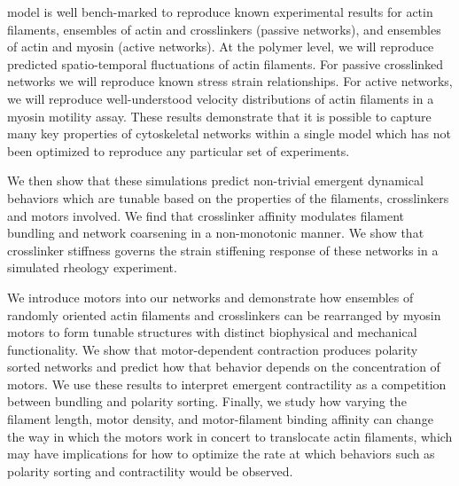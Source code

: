 \documentclass[12pt]{article} \usepackage{times} \usepackage{graphicx}
\begin{document}
model is well bench-marked to reproduce known experimental results for actin
filaments, ensembles of actin and crosslinkers (passive networks), and
ensembles of actin and myosin (active networks).  At the polymer level, we will
reproduce predicted spatio-temporal fluctuations of actin filaments.  For
passive crosslinked networks we will reproduce known stress strain
relationships. For active networks, we will reproduce well-understood velocity
distributions of actin filaments in a myosin motility assay. These results
demonstrate that it is possible to capture many key properties of cytoskeletal
networks within a single model which has not been optimized to reproduce any
particular set of experiments.  \par We then show that these simulations
predict non-trivial emergent dynamical behaviors which are tunable based on the
properties of the filaments, crosslinkers and motors involved. We find that
crosslinker affinity modulates filament bundling and network coarsening in a
non-monotonic manner. We show that crosslinker stiffness governs the strain
stiffening response of these networks in a simulated rheology experiment.  \par
We introduce motors into our networks and demonstrate how ensembles of randomly
oriented actin filaments and crosslinkers can be rearranged by myosin motors to
form tunable structures with distinct biophysical and mechanical functionality.
We show that motor-dependent contraction produces polarity sorted networks and
predict how that behavior depends on the concentration of motors. We use these
results to interpret emergent contractility as a competition between bundling
and polarity sorting. Finally, we study how varying the filament length, motor
density, and motor-filament binding affinity can change the way in which the
motors work in concert to translocate actin filaments, which may have
implications for how to optimize the rate at which behaviors such as polarity
sorting and contractility would be observed. 

\end{document}
